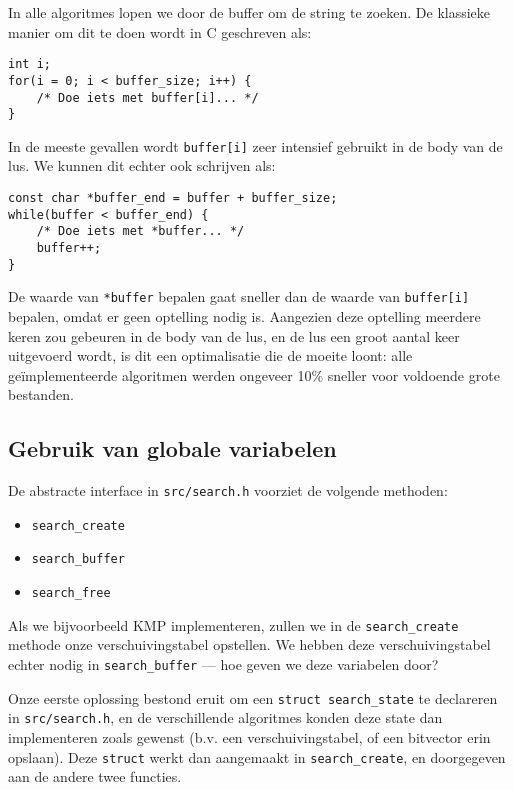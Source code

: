 \documentclass[a4paper,11pt]{article}
\begin{document}
In alle algoritmes lopen we door de buffer om de string te zoeken. De klassieke
manier om dit te doen wordt in C geschreven als:

\begin{verbatim}
int i;
for(i = 0; i < buffer_size; i++) {
    /* Doe iets met buffer[i]... */
}
\end{verbatim}

In de meeste gevallen wordt \verb#buffer[i]# zeer intensief gebruikt in de body
van de lus. We kunnen dit echter ook schrijven als:

\begin{verbatim}
const char *buffer_end = buffer + buffer_size;
while(buffer < buffer_end) {
    /* Doe iets met *buffer... */
    buffer++;
}
\end{verbatim}

De waarde van \verb#*buffer# bepalen gaat sneller dan de waarde van
\verb#buffer[i]# bepalen, omdat er geen optelling nodig is. Aangezien deze
optelling meerdere keren zou gebeuren in de body van de lus, en de lus een groot
aantal keer uitgevoerd wordt, is dit een optimalisatie die de moeite loont: alle
ge\"implementeerde algoritmen werden ongeveer 10\% sneller voor voldoende grote
bestanden.

\subsection{Gebruik van globale variabelen}

De abstracte interface in \verb#src/search.h# voorziet de volgende methoden:

\begin{itemize}
    \item \verb#search_create#
    \item \verb#search_buffer#
    \item \verb#search_free#
\end{itemize}

Als we bijvoorbeeld KMP implementeren, zullen we in de \verb#search_create#
methode onze verschuivingstabel opstellen. We hebben deze verschuivingstabel
echter nodig in \verb#search_buffer# — hoe geven we deze variabelen door?

Onze eerste oplossing bestond eruit om een \verb#struct search_state# te
declareren in \verb#src/search.h#, en de verschillende algoritmes konden
deze state dan implementeren zoals gewenst (b.v. een verschuivingstabel,
of een bitvector erin opslaan). Deze \verb#struct# werkt dan aangemaakt in
\verb#search_create#, en doorgegeven aan de andere twee functies.
\end{document}

